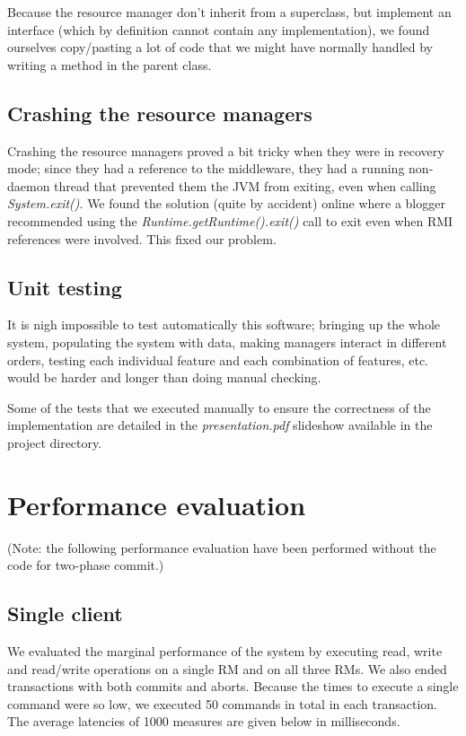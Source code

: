 \documentclass[11pt]{article}
\begin{document}
Because the resource manager don't inherit from a superclass, but
implement an interface (which by definition cannot contain any
implementation), we found ourselves copy/pasting a lot of code that we
might have normally handled by writing a method in the parent class.



\subsection{Crashing the resource managers}

Crashing the resource managers proved a bit tricky when they were in
recovery mode; since they had a reference to the middleware, they had
a running non-daemon thread that prevented them the JVM from exiting,
even when calling {\it System.exit()}.  We found the solution (quite
by accident) online where a blogger recommended using the {\it
  Runtime.getRuntime().exit()} call to exit even when RMI references
were involved.  This fixed our problem.


\subsection{Unit testing}

It is nigh impossible to test automatically this
software; bringing up the whole system, populating the system with
data, making managers interact in different orders, testing each
individual feature and each combination of features, etc. would be
harder and longer than doing manual checking.

Some of the tests that we executed manually to ensure the correctness of the
implementation are detailed in the {\it presentation.pdf} slideshow available
in the project directory.


\section{Performance evaluation}

(Note: the following performance evaluation have been performed
without the code for two-phase commit.)

\subsection{Single client}

We evaluated the marginal performance of the system by executing read,
write and read/write operations on a single RM and on all three RMs.
We also ended transactions with both commits and aborts.  Because the
times to execute a single command were so low, we executed 50 commands
in total in each transaction.  The average latencies of 1000 measures
are given below in milliseconds.
\end{document}
